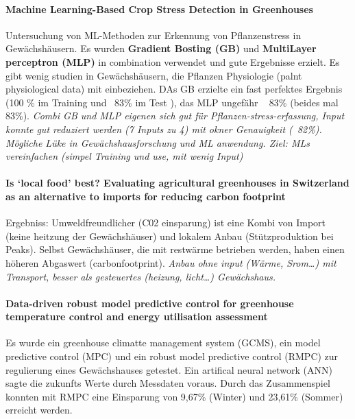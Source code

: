 \documentclass[a4paper, landscape]{article}
\begin{document}
\paragraph{Machine {Learning}-{Based} {Crop} {Stress} {Detection} in {Greenhouses}}
\cite{elvanidi_machine_2023} Untersuchung von ML-Methoden zur Erkennung von Pflanzenstress in Gewächshäusern. Es wurden \textbf{Gradient Bosting (GB)} und \textbf{MultiLayer perceptron (MLP)} in combination verwendet und gute Ergebnisse erzielt. Es gibt wenig studien in Gewächshäusern, die Pflanzen Physiologie (palnt physiological data) mit einbeziehen. DAs GB erzielte ein fast perfektes Ergebnis (100 \% im Training und ~83\% im Test ), das MLP ungefähr ~ 83\% (beides mal ~ 83\%).
\textit{Combi GB und MLP eigenen sich gut für Pflanzen-stress-erfassung, Input konnte gut reduziert werden (7 Inputs zu 4) mit okner Genauigkeit (~82\%). Mögliche Lüke in Gewächshausforschung und ML anwendung. Ziel: MLs vereinfachen (simpel Training und use, mit wenig Input)} \\

\paragraph{Is ‘local food’ best? {Evaluating} agricultural greenhouses in {Switzerland} as an alternative to imports for reducing carbon footprint}
\cite{burg_is_2025}Ergebniss: Umweldfreundlicher (C02 einsparung) ist eine Kombi von Import (keine heitzung der Gewächshäuser) und lokalem Anbau (Stützproduktion bei Peaks). Selbst Gewächshäuser, die mit restwärme betrieben werden, haben einen höheren Abgaswert (carbonfootprint).
\textit{Anbau ohne input (Wärme, Srom…) mit Transport, besser als gesteuertes (heizung, licht…) Gewächshaus.} \\

\paragraph{Data-driven robust model predictive control for greenhouse temperature control and energy utilisation assessment}
\cite{mahmood_data-driven_2023} Es wurde ein greenhouse climatte management system (GCMS), ein model predictive control (MPC) und ein robust model predictive control (RMPC) zur regulierung eines Gewächshauses getestet. Ein artifical neural network (ANN) sagte die zukunfts Werte durch Messdaten voraus. Durch das Zusammenspiel konnten mit RMPC eine Einsparung von 9,67\% (Winter) und 23,61\% (Sommer) erreicht werden.
\end{document}
